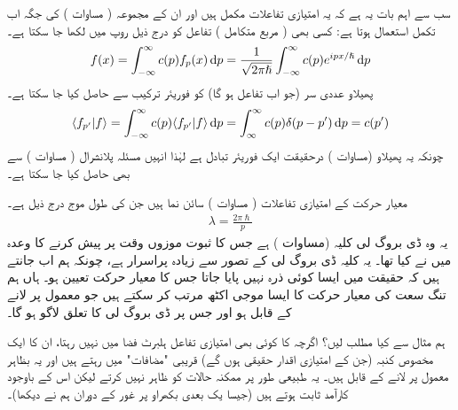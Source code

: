 سب سے اہم بات یہ ہے کہ یہ امتیازی تفاعلات مکمل ہیں اور ان کے مجموعہ ( مساوات ) کی جگہ اب تکمل استعمال ہوتا ہے: کسی بھی ( مربع  متکامل ) تفاعل  کو درج ذیل روپ میں لکھا جا سکتا ہے۔
\begin{align}\label{مساوات_قواعد_تفاعل_بطور_فوریئر_تکمل}
f(x) = \int_{-\infty}^{\infty} c(p)f_{p}(x)\dif p = \frac{1}{\sqrt{2\pi\hslash}}\int_{-\infty}^{\infty}c(p)e^{ipx/\hslash}\dif p
\end{align}
پھیلاو عددی سر (جو اب تفاعل  ہو گا) کو فوریئر ترکیب سے حاصل کیا جا سکتا ہے۔
\begin{align}
\langle f_{p'} | f \rangle = \int_{-\infty}^{\infty} c(p) \langle f_{p'} | f \rangle \dif p = \int_{\infty}^{\infty}c(p)\delta (p-p') \dif p = c(p')
\end{align}
چونکہ یہ پھیلاو (مساوات ) درحقیقت ایک فوریئر تبادل ہے لہٰذا انہیں مسئلہ پلانشرال ( مساوات ) سے بھی حاصل کیا جا سکتا ہے۔ 

معیار حرکت کے امتیازی تفاعلات ( مساوات ) سائن نما ہیں جن کی طول موج درج ذیل ہے۔
\begin{align}
\lambda = \frac{2\pi\hslash}{p} 
\end{align}
یہ وہ ڈی بروگ لی کلیہ (مساوات ) ہے جس کا ثبوت موزوں وقت پر پیش کرنے کا وعدہ میں نے کیا تھا۔ یہ کلیہ ڈی بروگ لی کے تصور سے زیادہ پراسرار ہے، چونکہ ہم اب جانتے ہیں کہ حقیقت میں ایسا کوئی ذرہ نہیں پایا جاتا جس کا معیار حرکت تعیین ہو۔ ہاں ہم تنگ سعت کی معیار حرکت کا ایسا موجی اکٹھ مرتب کر  سکتے ہیں جو معمول پر لانے کے قابل ہو اور جس پر ڈی بروگ لی کا تعلق لاگو ہو گا۔

ہم مثال  سے کیا مطلب لیں؟ اگرچہ  کا کوئی بھی امتیازی تفاعل ہلبرٹ فضا میں نہیں رہتا، ان کا ایک مخصوص کنبہ (جن کے امتیازی اقدار حقیقی ہوں گے) قریبی "مضافات" میں رہتے ہیں اور یہ بظاہر معمول پر لانے کے قابل ہیں۔ یہ طبیعی طور پر ممکنہ حالات کو ظاہر نہیں کرتے لیکن اس کے باوجود کارآمد ثابت ہوتے ہیں (جیسا یک بعدی بکھراو پر غور کے دوران ہم نے دیکھا)۔


